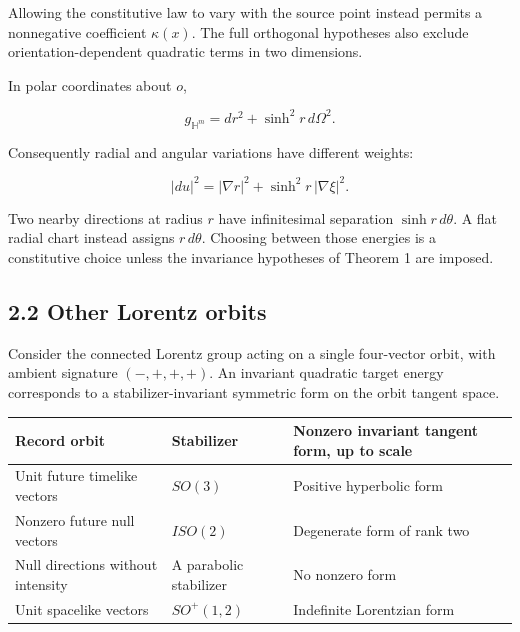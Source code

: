 \documentclass[
  11pt,
  a4paper,
]{article}
\newcounter{none} %
\begin{document}
Allowing the constitutive law to vary with the source point instead permits a nonnegative coefficient \(\kappa(x)\). The full orthogonal hypotheses also exclude orientation-dependent quadratic terms in two dimensions.

In polar coordinates about \(o\),

\[
g_{\mathbb H^m}=dr^2+\sinh^2r\,d\Omega^2.
\]

Consequently radial and angular variations have different weights:

\[
|du|^2=|\nabla r|^2+\sinh^2r\,|\nabla\xi|^2.
\]

Two nearby directions at radius \(r\) have infinitesimal separation \(\sinh r\,d\theta\). A flat radial chart instead assigns \(r\,d\theta\). Choosing between those energies is a constitutive choice unless the invariance hypotheses of Theorem 1 are imposed.

\subsection{2.2 Other Lorentz orbits}\label{other-lorentz-orbits}

Consider the connected Lorentz group acting on a single four-vector orbit, with ambient signature \((-,+,+,+)\). An invariant quadratic target energy corresponds to a stabilizer-invariant symmetric form on the orbit tangent space.

{\def\LTcaptype{none} %
\begin{longtable}[]{@{}
  >{\raggedright\arraybackslash}p{}
  >{\raggedright\arraybackslash}p{}
  >{\raggedright\arraybackslash}p{}@{}}
\toprule\noalign{}
\begin{minipage}[b]{\linewidth}\raggedright
Record orbit
\end{minipage} & \begin{minipage}[b]{\linewidth}\raggedright
Stabilizer
\end{minipage} & \begin{minipage}[b]{\linewidth}\raggedright
Nonzero invariant tangent form, up to scale
\end{minipage} \\
\midrule\noalign{}
\endhead
\bottomrule\noalign{}
\endlastfoot
Unit future timelike vectors & \(SO(3)\) & Positive hyperbolic form \\
Nonzero future null vectors & \(ISO(2)\) & Degenerate form of rank two \\
Null directions without intensity & A parabolic stabilizer & No nonzero form \\
Unit spacelike vectors & \(SO^+(1,2)\) & Indefinite Lorentzian form \\
\end{longtable}
}
\end{document}

